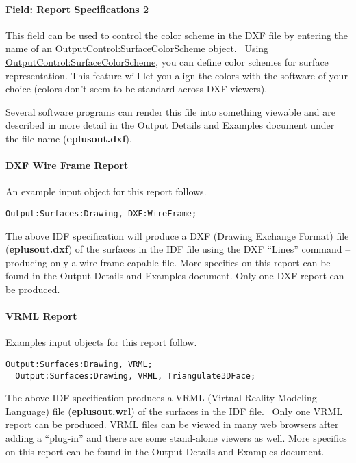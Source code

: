 \paragraph{Field: Report Specifications 2}\label{field-report-specifications-2}

This field can be used to control the color scheme in the DXF file by entering the name of an \hyperref[outputcontrolsurfacecolorscheme]{OutputControl:SurfaceColorScheme} object.~ Using \hyperref[outputcontrolsurfacecolorscheme]{OutputControl:SurfaceColorScheme}, you can define color schemes for surface representation. This feature will let you align the colors with the software of your choice (colors don't seem to be standard across DXF viewers).

Several software programs can render this file into something viewable and are described in more detail in the Output Details and Examples document under the file name (\textbf{eplusout.dxf}).

\paragraph{DXF Wire Frame Report}\label{dxf-wire-frame-report}

An example input object for this report follows.

\begin{lstlisting}
Output:Surfaces:Drawing, DXF:WireFrame;
\end{lstlisting}

The above IDF specification will produce a DXF (Drawing Exchange Format) file (\textbf{eplusout.dxf}) of the surfaces in the IDF file using the DXF ``Lines'' command -- producing only a wire frame capable file. More specifics on this report can be found in the Output Details and Examples document. Only one DXF report can be produced.

\paragraph{VRML Report}\label{vrml-report}

Examples input objects for this report follow.

\begin{lstlisting}
Output:Surfaces:Drawing, VRML;
  Output:Surfaces:Drawing, VRML, Triangulate3DFace;
\end{lstlisting}

The above IDF specification produces a VRML (Virtual Reality Modeling Language) file (\textbf{eplusout.wrl}) of the surfaces in the IDF file.~ Only one VRML report can be produced. VRML files can be viewed in many web browsers after adding a ``plug-in'' and there are some stand-alone viewers as well. More specifics on this report can be found in the Output Details and Examples document.

